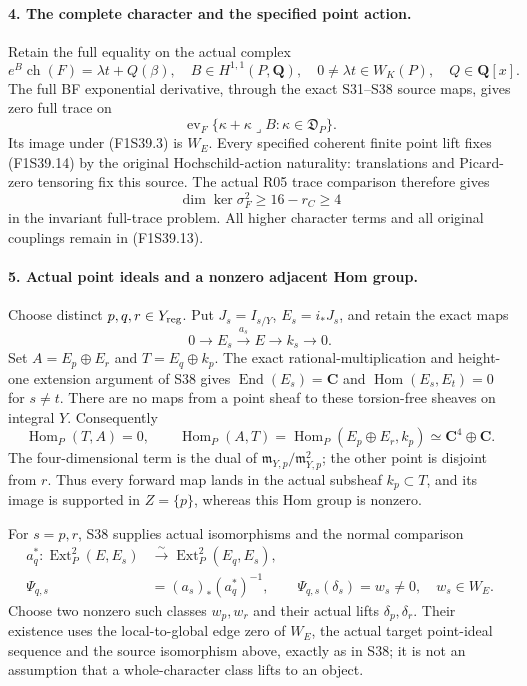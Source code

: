 \paragraph{4. The complete character and the specified point action.}
Retain the full equality on the actual complex
\[
 e^B\operatorname{ch}(F)=\lambda t+Q(\beta),
 \quad B\in H^{1,1}(P,\mathbf Q),\quad
 0\ne\lambda t\in W_K(P),\quad Q\in\mathbf Q[x].
 \tag{F1S39.13}
\]
The full BF exponential derivative, through
the exact S31--S38 source maps, gives zero
full trace on
\[
 \operatorname{ev}_F
   \{\kappa+\kappa\mathbin{\lrcorner}B:
                            \kappa\in\mathfrak D_P\}.
 \tag{F1S39.14}
\]
Its image under (F1S39.3) is $W_E$.
Every specified coherent finite point lift
fixes (F1S39.14) by the original
Hochschild-action naturality: translations and
Picard-zero tensoring fix this source.
The actual R05 trace comparison therefore gives
\[
             \dim\ker\sigma_F^2\ge16-r_C\ge4
 \tag{F1S39.15}
\]
in the invariant full-trace problem. All
higher character terms and all original
couplings remain in (F1S39.13).

\paragraph{5. Actual point ideals and a nonzero adjacent Hom group.}
Choose distinct $p,q,r\in Y_{\rm reg}$.
Put $J_s=I_{s/Y}$, $E_s=i_*J_s$, and
retain the exact maps
\[
 0\longrightarrow E_s\xrightarrow{a_s}E
                   \longrightarrow k_s\longrightarrow0.
 \tag{F1S39.16}
\]
Set $A=E_p\oplus E_r$ and $T=E_q\oplus k_p$.
The exact rational-multiplication and
height-one extension argument of S38 gives
$\operatorname{End}(E_s)=\mathbf C$ and
$\operatorname{Hom}(E_s,E_t)=0$ for $s\ne t$.
There are no maps from a point sheaf to these
torsion-free sheaves on integral $Y$.
Consequently
\[
 \operatorname{Hom}_P(T,A)=0,\qquad
 \operatorname{Hom}_P(A,T)
     =\operatorname{Hom}_P(E_p\oplus E_r,k_p)
     \simeq\mathbf C^4\oplus\mathbf C.
 \tag{F1S39.17}
\]
The four-dimensional term is the dual of
$\mathfrak m_{Y,p}/\mathfrak m_{Y,p}^2$;
the other point is disjoint from $r$.
Thus every forward map lands in the actual
subsheaf $k_p\subset T$, and its image is
supported in $Z=\{p\}$, whereas this Hom
group is nonzero.

For $s=p,r$, S38 supplies actual isomorphisms
and the normal comparison
\[
\begin{split}
 a_q^*:\operatorname{Ext}^2_P(E,E_s)
       &\xrightarrow{\sim}\operatorname{Ext}^2_P(E_q,E_s),\\
 \Psi_{q,s}&=(a_s)_*(a_q^*)^{-1},
 \qquad \Psi_{q,s}(\delta_s)=w_s\ne0,
       \quad w_s\in W_E.
\end{split}
 \tag{F1S39.18}
\]
Choose two nonzero such classes $w_p,w_r$
and their actual lifts $\delta_p,\delta_r$.
Their existence uses the local-to-global edge
zero of $W_E$, the actual target point-ideal
sequence and the source isomorphism above,
exactly as in S38; it is not an assumption
that a whole-character class lifts to an object.

